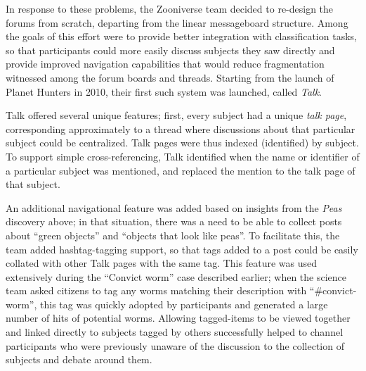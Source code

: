 \documentclass{sigchi}
\begin{document}


In response to these problems, the Zooniverse team decided to re-design the forums from scratch, departing from the linear messageboard structure.  Among the goals of this effort were to provide better integration with classification tasks, so that participants could more easily discuss subjects they saw directly and provide improved navigation capabilities that would reduce fragmentation witnessed among the forum boards and threads.  Starting from the launch of Planet Hunters in 2010, their first such system was launched, called \emph{Talk}.  

Talk offered several unique features; first, every subject had a unique \emph{talk page}, corresponding approximately to a thread where discussions about that particular subject could be centralized.  Talk pages were thus indexed (identified) by subject.  To support simple cross-referencing, Talk identified when the name or identifier of a particular subject was mentioned, and replaced the mention to the talk page of that subject.  

An additional navigational feature was added based on insights from the \emph{Peas} discovery above; in that situation, there was a need to be able to collect posts about ``green objects'' and ``objects that look like peas''.  To facilitate this, the team added hashtag-tagging support, so that tags added to a post could be easily collated with other Talk pages with the same tag.   This feature was used extensively during the ``Convict worm'' case described earlier; when the science team asked citizens to tag any worms matching their description with ``\#convict-worm'', this tag was quickly adopted by participants and generated a large number of hits of potential worms.  Allowing tagged-items to be viewed together and linked directly to subjects tagged by others successfully helped to channel participants who were previously unaware of the discussion to the collection of subjects and debate around them.
\end{document}
